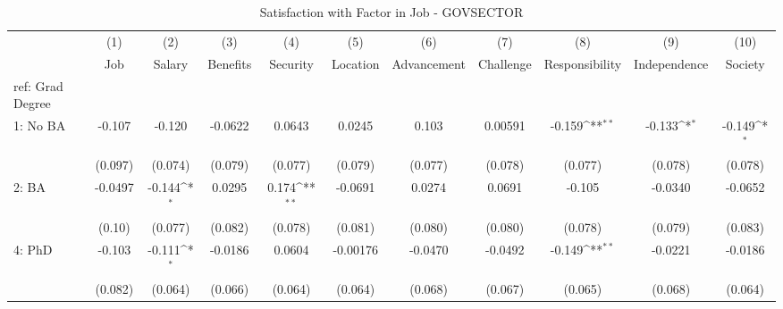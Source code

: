 \begin{table}[htbp]\centering
\def\sym#1{\ifmmode^{#1}\else\(^{#1}\)\fi}
\caption{Satisfaction with Factor in Job - GOVSECTOR \label{tab1}}
\begin{tabular}{l*{10}{c}}
\hline\hline
  &\multicolumn{1}{c}{(1)}&\multicolumn{1}{c}{(2)}&\multicolumn{1}{c}{(3)}&\multicolumn{1}{c}{(4)}&\multicolumn{1}{c}{(5)}&\multicolumn{1}{c}{(6)}&\multicolumn{1}{c}{(7)}&\multicolumn{1}{c}{(8)}&\multicolumn{1}{c}{(9)}&\multicolumn{1}{c}{(10)}\\
  &\multicolumn{1}{c}{Job}&\multicolumn{1}{c}{Salary}&\multicolumn{1}{c}{Benefits}&\multicolumn{1}{c}{Security}&\multicolumn{1}{c}{Location}&\multicolumn{1}{c}{Advancement}&\multicolumn{1}{c}{Challenge}&\multicolumn{1}{c}{Responsibility}&\multicolumn{1}{c}{Independence}&\multicolumn{1}{c}{Society}\\
\hline
ref: Grad Degree&                     &                     &                     &                     &                     &                     &                     &                     &                     &                     \\
[1em]
1: No BA&      -0.107         &      -0.120         &     -0.0622         &      0.0643         &      0.0245         &       0.103         &     0.00591         &      -0.159\sym{**} &      -0.133\sym{*}  &      -0.149\sym{*}  \\
  &     (0.097)         &     (0.074)         &     (0.079)         &     (0.077)         &     (0.079)         &     (0.077)         &     (0.078)         &     (0.077)         &     (0.078)         &     (0.078)         \\
[1em]
2: BA&     -0.0497         &      -0.144\sym{*}  &      0.0295         &       0.174\sym{**} &     -0.0691         &      0.0274         &      0.0691         &      -0.105         &     -0.0340         &     -0.0652         \\
  &      (0.10)         &     (0.077)         &     (0.082)         &     (0.078)         &     (0.081)         &     (0.080)         &     (0.080)         &     (0.078)         &     (0.079)         &     (0.083)         \\
[1em]
4: PhD&      -0.103         &      -0.111\sym{*}  &     -0.0186         &      0.0604         &    -0.00176         &     -0.0470         &     -0.0492         &      -0.149\sym{**} &     -0.0221         &     -0.0186         \\
  &     (0.082)         &     (0.064)         &     (0.066)         &     (0.064)         &     (0.064)         &     (0.068)         &     (0.067)         &     (0.065)         &     (0.068)         &     (0.064)         \\

\end{tabular}
\end{table}
